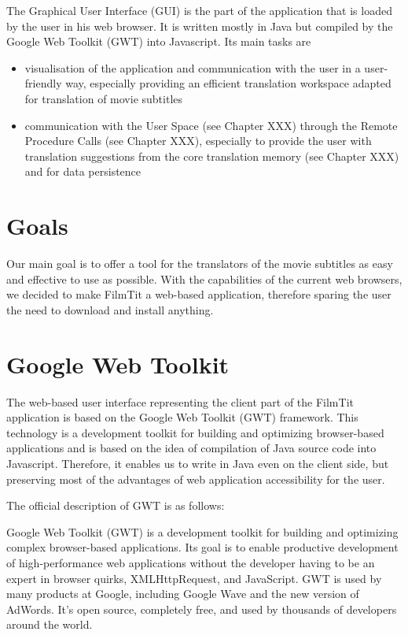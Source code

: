 
The Graphical User Interface (GUI) is the part of the application that is loaded by the user in his web browser. It is written mostly in Java but compiled by the Google Web Toolkit (GWT) into Javascript. Its main tasks are

\begin{itemize}
\item visualisation of the application and communication with the user in a user-friendly way, especially providing an efficient translation workspace adapted for translation of movie subtitles
\item communication with the User Space (see Chapter XXX) through the Remote Procedure Calls (see Chapter XXX), especially to provide the user with translation suggestions from the core translation memory (see Chapter XXX) and for data persistence
\end{itemize}

\section{Goals}
Our main goal is to offer a tool for the translators of the movie subtitles as easy and effective to use as possible. With the capabilities of the current web browsers, we decided to make FilmTit a web-based application, therefore sparing the user the need to download and install anything.

\section{Google Web Toolkit}
The web-based user interface representing the client part of the FilmTit application is based on the Google Web Toolkit (GWT) framework. This technology is a development toolkit for building and optimizing browser-based applications %
and is based on the idea of compilation of Java source code into Javascript. Therefore, it enables us to write in Java even on the client side, but preserving most of the advantages of web application accessibility for the user.

The official description of GWT is as follows:

Google Web Toolkit (GWT) is a development toolkit for building and optimizing complex browser-based applications. Its goal is to enable productive development of high-performance web applications without the developer having to be an expert in browser quirks, XMLHttpRequest, and JavaScript. GWT is used by many products at Google, including Google Wave and the new version of AdWords. It's open source, completely free, and used by thousands of developers around the world.

